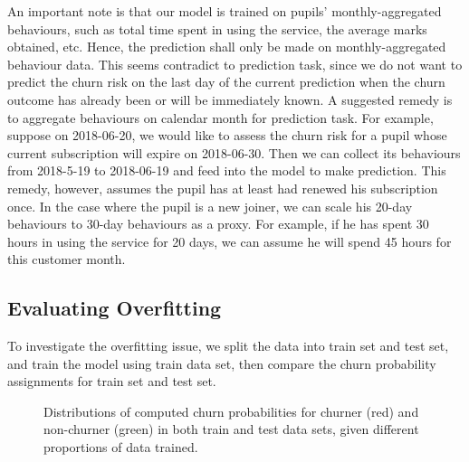 An important note is that our model is trained on pupils' monthly-aggregated behaviours, such as total time spent in using the service, the average marks obtained, etc. Hence, the prediction shall only be made on monthly-aggregated behaviour data. This seems contradict to prediction task, since we do not want to predict the churn risk on the last day of the current prediction when the churn outcome has already been or will be immediately known. A suggested remedy is to aggregate behaviours on calendar month for prediction task. For example, suppose on 2018-06-20, we would like to assess the churn risk for a pupil whose current subscription will expire on 2018-06-30. Then we can collect its behaviours from 2018-5-19 to 2018-06-19 and feed into the model to make prediction. This remedy, however, assumes the pupil has at least had renewed his subscription once. In the case where the pupil is a new joiner, we can scale his 20-day behaviours to 30-day behaviours as a proxy. For example, if he has spent 30 hours in using the service for 20 days, we can assume he will spend 45 hours for this customer month.

\subsection{Evaluating Overfitting}

To investigate the overfitting issue, we split the data into train set and test set, and train the model using train data set, then compare the churn probability assignments for train set and test set.

\begin{figure}[!h]
\centering
	\hspace{0mm}
	\hspace{0mm}
\caption{Distributions of computed churn probabilities for churner (red) and non-churner (green) in both train and test data sets, given different proportions of data trained.}
\label{eq:overfitting}
\end{figure}

